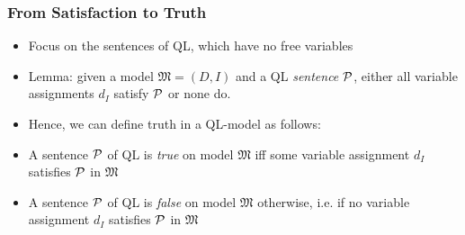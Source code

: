 \begin{frame}
\frametitle{From Satisfaction to Truth}

\begin{itemize}[<+->]

\item Focus on the sentences of QL, which have no free variables

\item \alert{Lemma}: given a model $\mathfrak{M} = (D, I)$ and a QL \textit{sentence} $\mathcal{P}$, either all variable assignments $d_I$ satisfy $\mathcal{P}$ or none do. 

\item Hence, we can define truth in a QL-model as follows: 

\item  A sentence $\mathcal{P}$ of QL is \emph{true} on model $\mathfrak{M}$ iff some variable assignment $d_I$ satisfies $\mathcal{P}$ in $\mathfrak{M}$

\item A sentence $\mathcal{P}$ of QL is \emph{false} on model $\mathfrak{M}$ otherwise, i.e. if no variable assignment $d_I$ satisfies $\mathcal{P}$ in $\mathfrak{M}$







\end{itemize}
\end{frame}

